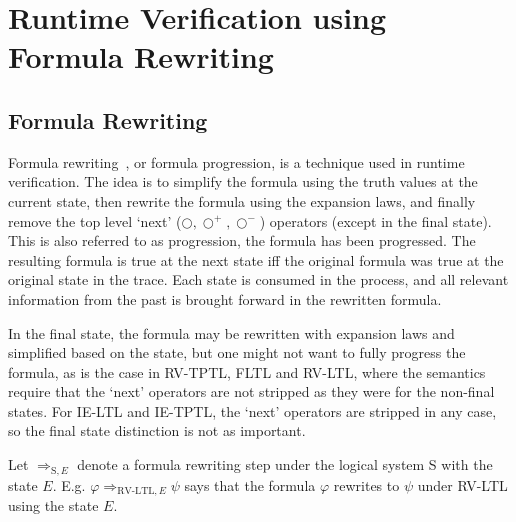 \documentclass[a4paper]{article}
\newcommand{\tiff}{\text{ iff }}
\newcommand{\sn}{\bigcirc^+}
\newcommand{\wn}{\bigcirc^-}
\newcommand{\rw}[1]{\Rightarrow_{#1}}
\begin{document}



\section{Runtime Verification using Formula Rewriting}
\subsection{Formula Rewriting}
Formula rewriting~\autocite{rosu2005rewriting}, or formula progression, is a technique used in runtime verification.
The idea is to simplify the formula using the truth values at the current state, then rewrite the formula using the expansion laws, and finally remove the top level `next' ($\bigcirc,\sn,\wn$) operators (except in the final state). This is also referred to as progression, the formula has been progressed. The resulting formula is true at the next state iff the original formula was true at the original state in the trace.
Each state is consumed in the process, and all relevant information from the past is brought forward in the rewritten formula.

In the final state, the formula may be rewritten with expansion laws and simplified based on the state, but one might not want to fully progress the formula, as is the case in RV-TPTL, FLTL and RV-LTL, where the semantics require that the `next' operators are not stripped as they were for the non-final states. For IE-LTL and IE-TPTL, the `next' operators are stripped in any case, so the final state distinction is not as important.

\begin{notn}[Rewrites]

  Let $\rw{\text{S},E}$ denote a formula rewriting step under the logical system S with the state $E$. E.g. $\varphi\rw{\text{RV-LTL},E}\psi$ says that the formula $\varphi$ rewrites to $\psi$ under RV-LTL using the state $E$.
\end{notn}
\end{document}
